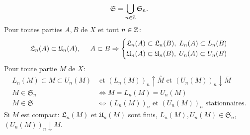 \begin{propn}\label{Prop:PromApprox}
\begin{displaymath}
 \mathfrak{S} = \bigcup_{n \in \mathbb{Z}} \mathfrak{S}_n.
\end{displaymath}
Pour toutes parties $A, B$ de $X$ et tout $n\in \mathbb{Z}$:
\begin{displaymath}
 \mathfrak{L}_n(A) \subset \mathfrak{U}_n(A), \hspace{0.5cm} A\subset B \Rightarrow
   \left\lbrace
     \begin{aligned}
        \mathfrak{L}_n(A) &\subset \mathfrak{L}_n(B), \; L_n(A) \subset L_n(B) \\
        \mathfrak{U}_n(A) &\subset \mathfrak{U}_n(B), \; U_n(A) \subset U_n(B)
     \end{aligned}
  \right.
\end{displaymath}
Pour toute partie $M$ de $X$:
 \begin{align*}
    L_n(M) \subset M \subset U_n(M) &\text{ et } (L_n(M))_n \uparrow \overset{\circ}{M} \text{ et } (U_n(M))_n \downarrow \overline{M}\\
    M\in \mathfrak{S}_n &\Leftrightarrow M = L_n(M) = U_n(M) \\
    M\in \mathfrak{S} &\Leftrightarrow (L_n(M))_n \text{ et } (U_n(M))_n \text{ stationnaires}.
 \end{align*}
Si $M$ est compact: $\mathfrak{L}_n(M)$ et $\mathfrak{U}_n(M)$ sont finis, $L_n(M), U_n(M) \in \mathfrak{S}_n$, $(U_n(M))_n \downarrow M$.
\end{propn}
